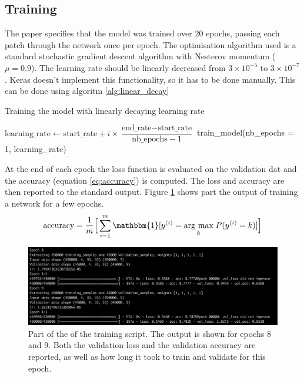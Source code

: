 \documentclass[12pt,a4paper,twoside,openright]{report}
\newcommand{\argmax}[1]{\underset{#1}{\operatorname{arg}\,\operatorname{max}}\;} %
\begin{document}
\subsection{Training}
The paper specifies that the model was trained over 20 epochs, passing each patch through the network once per epoch. The optimisation algorithm used is a standard stochastic gradient descent algorithm with Nesterov momentum ($\mu = 0.9$). The learning rate should be linearly decreased from $3 \times 10^{-5}$ to $3 \times 10^{-7}$. Keras doesn't implement this functionality, so it has to be done manually. This can be done using algoritm \ref{alg:linear_decay}

\begin{algorithm}
\caption{Training the model with linearly decaying learning rate}\label{alg:linear_decay}
\begin{algorithmic}[1]
	\State $\text{learning\_rate} \gets \text{start\_rate} + i \times \dfrac{\text{end\_rate} - \text{start\_rate} }{ \text{nb\_epochs} - 1 }$
	\State train\_model(nb\_epochs = 1, learning\_rate)
\EndFor
\end{algorithmic}
\end{algorithm}

At the end of each epoch the loss function is evaluated on the validation dat and the accuracy (equation \ref{eq:accuracy}) is computed. The loss and accuracy are then reported to the standard output. Figure \ref{fig:training_output} shows part the output of training a network for a few epochs.
\begin{equation}
	\label{eq:accuracy}
		\text{accuracy} = 
	\frac{1}{m}\Big[\sum_{i=1}^m\mathbbm{1}[y^{(i)} = \argmax{k}P(y^{(i)}=k)]\Big]
\end{equation}
\begin{figure}[h]
	\centering
	\includegraphics[width=\textwidth]{training_output}
	\caption[Part of the output of the training script]{Part of the of the training script. The output is shown for epochs 8 and 9. Both the validation loss and the validation accuracy are reported, as well as how long it took to train and validate for this epoch.}
	\label{fig:training_output}
\end{figure}
\end{document}
